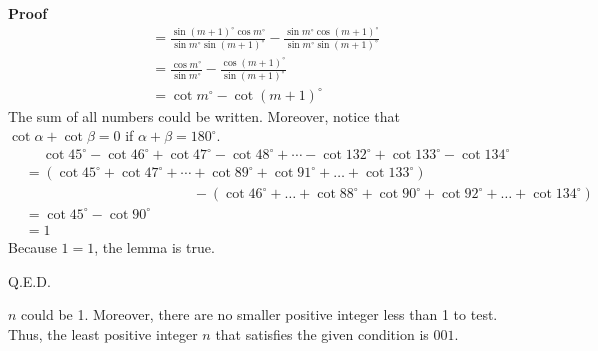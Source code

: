 \begin{enumerate}
\textbf{Proof} 
 \begin{align*}     &=\frac{\sin (m+1)^\circ \cos m^\circ}{\sin m^\circ \sin (m+1)^\circ} - \frac{\sin m^\circ \cos (m+1)^\circ}{\sin m^\circ \sin (m+1)^\circ} \\[0.5em]     &=\frac{\cos m^\circ}{\sin m^\circ} - \frac{\cos (m+1)^\circ}{\sin (m+1)^\circ} \\[0.5em]     &= \cot m^\circ - \cot (m+1)^\circ \end{align*}
The sum of all numbers could be written. Moreover, notice that $\cot\alpha + \cot\beta = 0$ if $\alpha + \beta = 180^\circ$.
 \begin{align*}     &\quad \ \cot 45^\circ - \cot 46^\circ + \cot 47^\circ - \cot 48^\circ + \cdots - \cot 132^\circ + \cot 133^\circ - \cot 134^\circ \\     &= (\cot 45^\circ + \cot 47^\circ + \cdots + \cot 89^\circ + \cot 91^\circ + \dots + \cot 133^\circ) \\     &\qquad\qquad\qquad\qquad\qquad\qquad - (\cot 46^\circ + \dots + \cot 88^\circ + \cot 90^\circ + \cot 92^\circ + \dots + \cot 134^\circ) \\     &= \cot 45^\circ - \cot 90^\circ \\     &= 1 \end{align*}
Because $1 = 1$, the lemma is true.

 Q.E.D.

 $n$ could be 1. Moreover, there are no smaller positive integer less than 1 to test. Thus, the least positive integer $n$ that satisfies the given condition is $\boxed{001}$.

 


 


\end{enumerate}